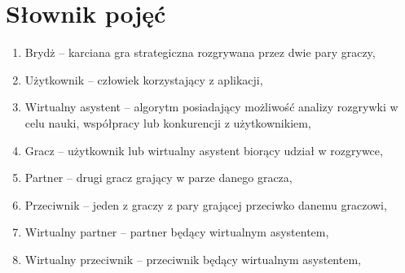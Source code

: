 \FloatBarrier

\section{Słownik pojęć}

\begin{enumerate}
    \item Brydż -- karciana gra strategiczna rozgrywana przez dwie pary graczy,
    \item Użytkownik -- człowiek korzystający z aplikacji,
    \item Wirtualny asystent -- algorytm posiadający możliwość analizy rozgrywki w celu nauki, współpracy lub konkurencji z użytkownikiem,
    \item Gracz -- użytkownik lub wirtualny asystent biorący udział w rozgrywce,
    \item Partner -- drugi gracz grający w parze danego gracza,
    \item Przeciwnik -- jeden z graczy z pary grającej przeciwko danemu graczowi,
    \item Wirtualny partner -- partner będący wirtualnym asystentem,
    \item Wirtualny przeciwnik -- przeciwnik będący wirtualnym asystentem,
\end{enumerate}
